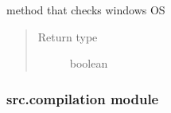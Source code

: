 \documentclass[a4paper,10pt,english]{sphinxmanual}
\begin{document}

\begin{fulllineitems}
\label{\detokenize{commands/apidoc/src:src.architecture.is_windows}}
method that checks windows OS
\begin{quote}\begin{description}
\item[{Return type}] \leavevmode
boolean

\end{description}\end{quote}

\end{fulllineitems}



\subsubsection{src.compilation module}
\label{\detokenize{commands/apidoc/src:module-src.compilation}}\label{\detokenize{commands/apidoc/src:src-compilation-module}}
\end{document}
